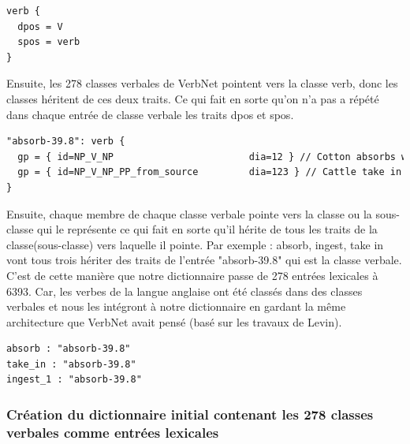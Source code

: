 \begin{lstlisting}[language=XML]
verb {
  dpos = V
  spos = verb
}
\end{lstlisting}

Ensuite, les 278 classes verbales de VerbNet pointent vers la classe verb, donc les classes héritent de ces deux traits. Ce qui fait en sorte qu'on n'a pas a répété dans chaque entrée de classe verbale les traits dpos et spos. 

\begin{lstlisting}[language=XML]
"absorb-39.8": verb {
  gp = { id=NP_V_NP                        dia=12 } // Cotton absorbs water.
  gp = { id=NP_V_NP_PP_from_source         dia=123 } // Cattle take in nutrients from their feed.
}
\end{lstlisting}

Ensuite, chaque membre de chaque classe verbale pointe vers la classe ou la sous-classe qui le représente ce qui fait en sorte qu'il hérite de tous les traits de la classe(sous-classe) vers laquelle il pointe. Par exemple : absorb, ingest, take in vont tous trois hériter des traits de l'entrée "absorb-39.8" qui est la classe verbale. C'est de cette manière que notre dictionnaire passe de 278 entrées lexicales à 6393. Car, les verbes de la langue anglaise ont été classés dans des classes verbales et nous les intégront à notre dictionnaire en gardant la même architecture que VerbNet avait pensé (basé sur les travaux de Levin).

\begin{lstlisting}[language=XML]
absorb : "absorb-39.8"
take_in : "absorb-39.8"
ingest_1 : "absorb-39.8"
\end{lstlisting}

\subsubsection{Création du dictionnaire initial contenant les 278 classes verbales comme entrées lexicales}

